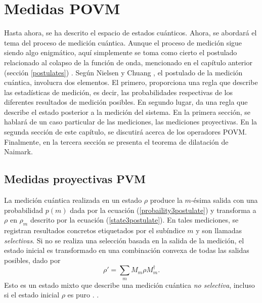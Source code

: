 \chapter{Medidas POVM}\label{MedidaPOVM}
Hasta ahora, se ha descrito el espacio de estados cuánticos. Ahora, se abordará
el tema del proceso de medición cuántica. Aunque el proceso de medición  sigue
siendo algo enigmático, aquí simplemente se toma como cierto el
postulado relacionado al colapso de la función de onda, mencionado en el capítulo
anterior (sección {\ref{postulates}}) . Según Nielsen y Chuang
{\cite{nielsen_chuang_2010}}, el postulado de la medición cuántica, involucra
dos elementos. El primero, proporciona una regla que describe las estadísticas
de medición, es decir, las probabilidades respectivas de los diferentes
resultados de medición posibles. En segundo lugar, da una regla que describe el
estado posterior a la medición del sistema.  En la primera sección, se hablará
de un caso particular de las mediciones, las mediciones proyectivas. En la
segunda sección de este capítulo, se discutirá acerca de los operadores POVM\@.
Finalmente, en la tercera sección se presenta el teorema de dilatación de
Naimark. 

\section{Medidas proyectivas PVM} %
La medición cuántica realizada en un estado $\rho$  produce  la $m$-ésima 
salida con una probabilidad $p(m)$ dada por la ecuación
(\ref{probaility3postulate}) y transforma a $\rho $ en $\rho_m$ descrito por la
ecuación (\ref{state3postulate}). En tales mediciones, se registran resultados
concretos etiquetados por el subíndice $m$ y son llamadas \textit{selectivas}.
Si no se realiza una selección basada en la salida de la medición, el estado
inicial es transformado en una combinación convexa de todas las salidas
posibles, dado por 
\begin{equation}\label{non-selective-measure}
	\rho'=\sum_m M_m\rho M_m^\dagger.
\end{equation}
Esto es un estado mixto que  describe una medición cuántica \textit{no selectiva}, incluso si el estado inicial $\rho$ es puro .%
{\cite{2007geometry}}.

